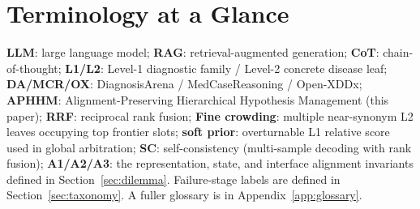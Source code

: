 \documentclass[11pt,a4paper]{article}
\begin{document}
\section*{Terminology at a Glance}
\textbf{LLM}: large language model;
\textbf{RAG}: retrieval-augmented generation;
\textbf{CoT}: chain-of-thought;
\textbf{L1/L2}: Level-1 diagnostic family / Level-2 concrete disease leaf;
\textbf{DA/MCR/OX}: DiagnosisArena / MedCaseReasoning / Open-XDDx;
\textbf{APHHM}: Alignment-Preserving Hierarchical Hypothesis Management (this paper);
\textbf{RRF}: reciprocal rank fusion;
\textbf{Fine crowding}: multiple near-synonym L2 leaves occupying top frontier slots;
\textbf{soft prior}: overturnable L1 relative score used in global arbitration;
\textbf{SC}: self-consistency (multi-sample decoding with rank fusion);
\textbf{A1/A2/A3}: the representation, state, and interface alignment invariants defined in Section~\ref{sec:dilemma}.
Failure-stage labels are defined in Section~\ref{sec:taxonomy}.
A fuller glossary is in Appendix~\ref{app:glossary}.






\end{document}

